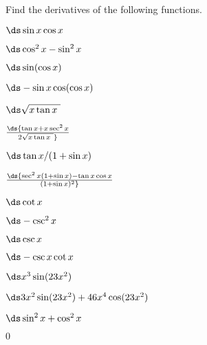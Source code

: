 \begin{exercises}
Find the derivatives of the following functions.

\twocol

\begin{exercise} $\ds \sin x\cos x$
\begin{answer} $\ds \cos^2 x-\sin^2 x$
\end{answer}\end{exercise}

\begin{exercise} $\ds \sin(\cos x)$
\begin{answer} $\ds -\sin x\cos(\cos x)$
\end{answer}\end{exercise}

\begin{exercise} $\ds \sqrt{x\tan x\ }$
\begin{answer} $\ds{\tan x+x\sec^2 x\over2\sqrt{x\tan x\ }}$
\end{answer}\end{exercise}

\begin{exercise} $\ds \tan x/(1+\sin x)$
\begin{answer} $\ds {\sec^2 x(1+\sin x)-\tan x \cos x\over (1+\sin x)^2}$
\end{answer}\end{exercise}

\begin{exercise} $\ds \cot x$
\begin{answer} $\ds  -\csc^2 x$
\end{answer}\end{exercise}

\begin{exercise} $\ds \csc x$
\begin{answer} $\ds  -\csc x\cot x$
\end{answer}\end{exercise}

\begin{exercise} $\ds x^3 \sin (23x^2 )$
\begin{answer} $\ds 3x^2\sin(23x^2)+46x^4\cos(23x^2)$
\end{answer}\end{exercise}

\begin{exercise} $\ds \sin ^2 x + \cos ^2 x$
 \begin{answer} $0$
\end{answer}\end{exercise}


\end{exercises}
